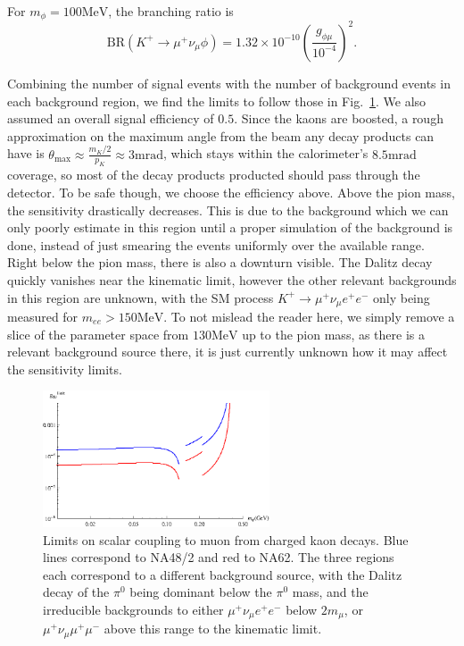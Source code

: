 \noindent For $m_\phi = 100\textrm{MeV}$, the branching ratio is
\begin{equation}
    \textrm{BR}(K^+ \rightarrow \mu^+ \nu_\mu \phi) = 1.32\times 10^{-10} \left(\frac{g_{\phi\mu}}{10^{-4}}\right)^2\textrm{.}
\end{equation}

Combining the number of signal events with the number of background events in each background region, we find the limits to follow those in Fig.~\ref{fig:kaon_limits}.
We also assumed an overall signal efficiency of $0.5$.
Since the kaons are boosted, a rough approximation on the maximum angle from the beam any decay products can have is $\theta_\textrm{max} \approx \frac{m_K/2}{p_K} \approx 3\textrm{mrad}$, which stays within the calorimeter's $8.5\textrm{mrad}$ coverage, so most of the decay products producted should pass through the detector.
To be safe though, we choose the efficiency above.
Above the pion mass, the sensitivity drastically decreases.
This is due to the background which we can only poorly estimate in this region until a proper simulation of the background is done, instead of just smearing the events uniformly over the available range.
Right below the pion mass, there is also a downturn visible.
The Dalitz decay quickly vanishes near the kinematic limit, however the other relevant backgrounds in this region are unknown, with the SM process $K^+ \rightarrow \mu^+ \nu_\mu e^+ e^-$ only being measured for $m_{ee} > 150\textrm{MeV}$.
To not mislead the reader here, we simply remove a slice of the parameter space from $130\textrm{MeV}$ up to the pion mass, as there is a relevant background source there, it is just currently unknown how it may affect the sensitivity limits.

\begin{figure}[h]
    \centering
    \includegraphics[width=0.6\textwidth]{Figures/limits/kaon_all}
    \caption{Limits on scalar coupling to muon from charged kaon decays. Blue lines correspond to NA48/2 and red to NA62. The three regions each correspond to a different background source, with the Dalitz decay of the $\pi^0$ being dominant below the $\pi^0$ mass, and the irreducible backgrounds to either $\mu^+ \nu_\mu e^+ e^-$ below $2m_\mu$, or $\mu^+ \nu_\mu \mu^+ \mu^-$ above this range to the kinematic limit.}
    \label{fig:kaon_limits}
\end{figure}
